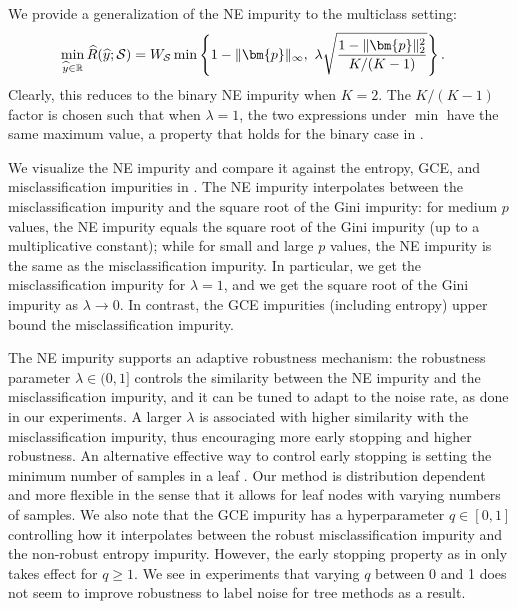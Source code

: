 \documentclass[letterpaper]{article} %
\newcommand{\R}{{\mathbb{R}}}
\newcommand{\bp}{{\bm{p}}}
\newcommand{\cS}{{\cal{S}}}
\newcommand{\WS}{{W_{\cal{S}}}}
\begin{document}
We provide a generalization of the NE impurity to the multiclass setting:
\begin{align*}
	\underset{\widehat{y}\in\R}{\min}\, \widehat{R}(\widehat{y};\cS)
	&= \WS \min\left\{
		1-\|\bp\|_\infty,\
		\lambda
		\sqrt{\frac{1-\|\bp\|_2^2}{K/(K-1)}}
		\right\}.
\end{align*}
Clearly, this reduces to the binary NE impurity when $K = 2$.
The $K/(K-1)$ factor is chosen such that when
$\lambda
= 1$,
the
two expressions under $\min$ have the same maximum value,
a property that
holds for the binary case in .

We visualize the NE impurity and compare it against the
entropy,
GCE, %
and
misclassification
impurities in .
The NE impurity interpolates between the misclassification impurity and the
square root of the Gini impurity:
for medium $p$ values, the NE impurity equals the square root of the Gini impurity
(up to a multiplicative constant); while for small and large $p$ values, the NE
impurity is the same as the misclassification impurity.
In particular, we get the misclassification impurity for $\lambda=1$, and we get
the square root of the Gini impurity as $\lambda \to 0$.
In contrast, the GCE impurities (including entropy) upper bound the
misclassification impurity.

The NE impurity supports an adaptive robustness mechanism:
the robustness parameter $\lambda \in (0, 1]$ controls the similarity between
the NE impurity and the misclassification impurity, and it can be tuned to adapt
to the noise rate, as done in our experiments.
A larger $\lambda$ is associated with higher similarity with the
misclassification impurity, thus encouraging more early stopping and higher
robustness.
An alternative effective way to control early stopping is setting the minimum
number of samples in a leaf \cite{ghosh2017robustness}.
Our method is distribution dependent and more flexible in the sense that it
allows for leaf nodes with varying numbers of samples.
We also note that the GCE impurity \cite{zhang2018generalized} has a
hyperparameter $q\in[0,1]$ controlling how it interpolates between the robust
misclassification impurity and the non-robust entropy impurity.
However, the early stopping property as in  only takes
effect for $q \geq 1$.
We see in experiments that varying $q$ between 0 and 1 does not seem to improve
robustness to label noise for tree methods as a result.
\end{document}
